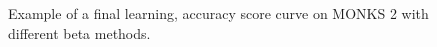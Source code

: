 \begin{appendices}
             \begin{figure}[H]
                \centering
                \begin{subfigure}{0.40\textwidth}
                    \caption{}
                    \label{fig:monks_2_MSE_CGD}
                \end{subfigure}
                \begin{subfigure}{0.40\textwidth}
                    \caption{}
                    \label{fig:monks_2_ACC_CGD}
                \end{subfigure}
                \caption{Example of a final learning, accuracy score curve on MONKS 2 with different beta methods.}
                \label{fig:monks_2_CGD}
            \end{figure}


\end{appendices}
